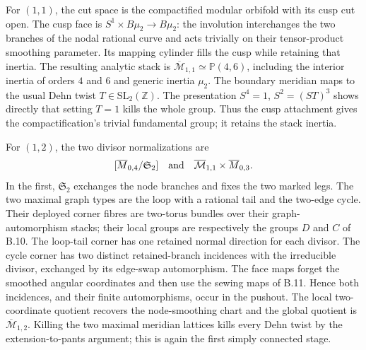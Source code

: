 For $(1,1)$, the cut space is the compactified modular orbifold with its cusp cut open. The cusp face is $S^1\times B\mu_2\to B\mu_2$: the involution interchanges the two branches of the nodal rational curve and acts trivially on their tensor-product smoothing parameter. Its mapping cylinder fills the cusp while retaining that inertia. The resulting analytic stack is $\overline{\mathcal M}_{1,1}\simeq\mathbb P(4,6)$, including the interior inertia of orders $4$ and $6$ and generic inertia $\mu_2$. The boundary meridian maps to the usual Dehn twist $T\in\mathrm{SL}_2(\mathbb Z)$. The presentation $S^4=1$, $S^2=(ST)^3$ shows directly that setting $T=1$ kills the whole group. Thus the cusp attachment gives the compactification's trivial fundamental group; it retains the stack inertia.

For $(1,2)$, the two divisor normalizations are
\[
 [\overline M_{0,4}/\mathfrak S_2]\quad\hbox{and}\quad
 \overline{\mathcal M}_{1,1}\times\overline M_{0,3}.
\]
In the first, $\mathfrak S_2$ exchanges the node branches and fixes the two marked legs. The two maximal graph types are the loop with a rational tail and the two-edge cycle. Their deployed corner fibres are two-torus bundles over their graph-automorphism stacks; their local groups are respectively the groups $D$ and $C$ of B.10. The loop-tail corner has one retained normal direction for each divisor. The cycle corner has two distinct retained-branch incidences with the irreducible divisor, exchanged by its edge-swap automorphism. The face maps forget the smoothed angular coordinates and then use the sewing maps of B.11. Hence both incidences, and their finite automorphisms, occur in the pushout. The local two-coordinate quotient recovers the node-smoothing chart and the global quotient is $\overline{\mathcal M}_{1,2}$. Killing the two maximal meridian lattices kills every Dehn twist by the extension-to-pants argument; this is again the first simply connected stage.

